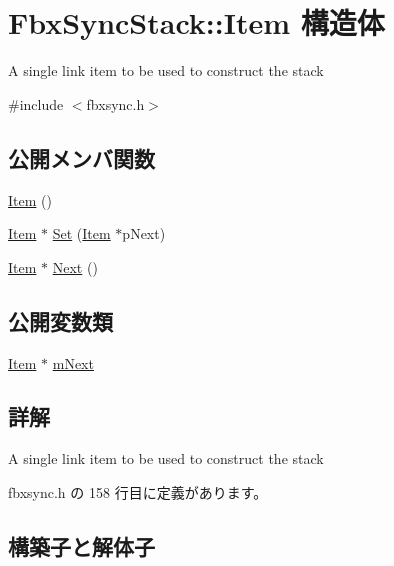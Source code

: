 \hypertarget{struct_fbx_sync_stack_1_1_item}{}\section{Fbx\+Sync\+Stack\+:\+:Item 構造体}
\label{struct_fbx_sync_stack_1_1_item}


A single link item to be used to construct the stack  




{\ttfamily \#include $<$fbxsync.\+h$>$}

\subsection*{公開メンバ関数}
\begin{DoxyCompactItemize}
\item 
\hyperlink{struct_fbx_sync_stack_1_1_item_a08442537e4eebbefc109a934ff308d7e}{Item} ()
\item 
\hyperlink{struct_fbx_sync_stack_1_1_item}{Item} $\ast$ \hyperlink{struct_fbx_sync_stack_1_1_item_a0f671eabe5aa22be73b340d313450423}{Set} (\hyperlink{struct_fbx_sync_stack_1_1_item}{Item} $\ast$p\+Next)
\item 
\hyperlink{struct_fbx_sync_stack_1_1_item}{Item} $\ast$ \hyperlink{struct_fbx_sync_stack_1_1_item_ac9530826bd267a41c9159e229c535140}{Next} ()
\end{DoxyCompactItemize}
\subsection*{公開変数類}
\begin{DoxyCompactItemize}
\item 
\hyperlink{struct_fbx_sync_stack_1_1_item}{Item} $\ast$ \hyperlink{struct_fbx_sync_stack_1_1_item_a8534ccca4fccd6b9ba2a689985e35430}{m\+Next}
\end{DoxyCompactItemize}


\subsection{詳解}
A single link item to be used to construct the stack 

 fbxsync.\+h の 158 行目に定義があります。



\subsection{構築子と解体子}
\mbox{\label{struct_fbx_sync_stack_1_1_item_a08442537e4eebbefc109a934ff308d7e}} 
